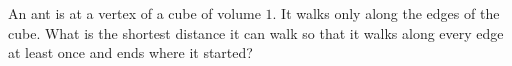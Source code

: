 An ant is at a vertex of a cube of volume $1$. It walks only along the edges of the cube. What is the shortest distance it can walk so that it walks along every edge at least once and ends where it started?
